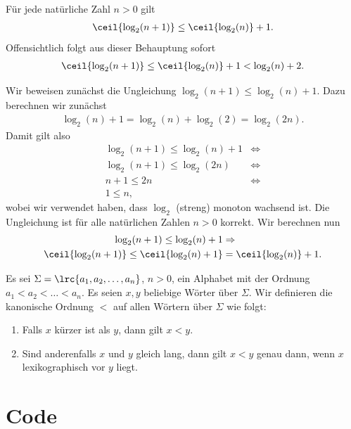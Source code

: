\begin{mytheorem}\label{mytheorem:Estimate}
	Für jede natürliche Zahl $n>0$ gilt
	\begin{align*}
		\ceil{\log_2(n+1)}\leq \ceil{\log_2(n)} + 1.
	\end{align*}
	Offensichtlich folgt aus dieser Behauptung sofort
	\begin{align*}
		\ceil{\log_2(n+1)}\leq \ceil{\log_2(n)} + 1 < \log_2(n) + 2.
	\end{align*}
	\begin{myproof}
		Wir beweisen zunächst die Ungleichung $\log_2(n+1) \leq \log_2(n) + 1$. Dazu berechnen wir zunächst
		\begin{align*}
			\log_2(n) + 1 = \log_2(n) + \log_2(2) = \log_2(2n).
		\end{align*}
		Damit gilt also
		\begin{align*}
			\log_2(n+1) \leq \log_2(n) + 1 & \iff \\
			\log_2(n+1) \leq \log_2(2n)    & \iff \\
			n + 1\leq 2n                   & \iff \\
			1 \leq n,
		\end{align*}
		wobei wir verwendet haben, dass $\log_2$ (streng) monoton wachsend ist. Die Ungleichung ist für alle natürlichen Zahlen $n>0$ korrekt.
		Wir berechnen nun
		\begin{align*}
			\log_2(n+1) \leq \log_2(n) + 1               & \Rightarrow             \\
			\ceil{\log_2(n+1)} \leq \ceil{\log_2(n) + 1} & = \ceil{\log_2(n)} + 1.
		\end{align*}
	\end{myproof}
\end{mytheorem}

\begin{mydefinition}
	Es sei $\Sigma = \lrc{a_1, a_2 , \ldots, a_n}$, $n > 0$, ein Alphabet mit der Ordnung $a_1 < a_2 < \ldots < a_n$. Es seien $x, y$ beliebige Wörter über $\Sigma$. Wir definieren die kanonische Ordnung $<$ auf allen Wörtern über $\Sigma$ wie folgt:
	\begin{enumerate}
		\item Falls $x$ kürzer ist als $y$, dann gilt $x < y$.
		\item Sind anderenfalls $x$ und $y$ gleich lang, dann gilt $x < y$ genau dann, wenn $x$ lexikographisch vor $y$ liegt.
	\end{enumerate}
\end{mydefinition}
\clearpage
\section{Code}



\clearpage

